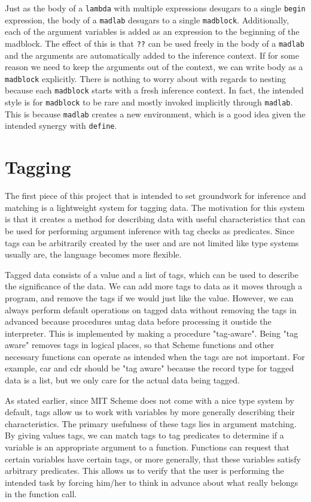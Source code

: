 \documentclass[11pt]{article}
\begin{document}
Just as the body of a \texttt{lambda} with multiple expressions
desugars to a single \texttt{begin} expression,
the body of a \texttt{madlab} desugars to a single \texttt{madblock}.
Additionally, each of the argument variables is added as an expression
to the beginning of the madblock.
The effect of this is that \texttt{??}
can be used freely in the body of a \texttt{madlab}
and the arguments are automatically added to the inference context.
If for some reason we need to keep the arguments out of the context,
we can write body as a \texttt{madblock} explicitly.
There is nothing to worry about with regards to nesting
because each \texttt{madblock} starts with a fresh inference context.
In fact, the intended style is for \texttt{madblock} to be rare
and mostly invoked implicitly through \texttt{madlab}.
This is because \texttt{madlab} creates a new environment,
which is a good idea given the intended synergy with \texttt{define}.

\section{Tagging}

The first piece of this project that is intended to set groundwork
for inference and matching is a lightweight system for tagging data.
The motivation for this system is that it creates a method for
describing data with useful characteristics that can be used for
performing argument inference with tag checks as predicates.
Since tags can be arbitrarily created by the user
and are not limited like type systems usually are,
the language becomes more flexible.

Tagged data consists of a value and a list of tags,
which can be used to describe the significance of the data.
We can add more tags to data as it moves through a program,
and remove the tags if we would just like the value.
However, we can always perform default operations on tagged data
without removing the tags in advanced because procedures
untag data before processing it oustide the interpreter. 
This is implemented by making a procedure "tag-aware".
Being "tag aware" removes tags in logical places, 
so that Scheme functions and other necessary functions
can operate as intended when the tags are not important.
For example, car and cdr should be "tag aware" because
the record type for tagged data is a list,
but we only care for the actual data being tagged.

As stated earlier, since MIT Scheme does not come 
with a nice type system by default,
tags allow us to work with variables
by more generally describing their characteristics.
The primary usefulness of these tags lies in argument matching.
By giving values tags, we can match tags to tag predicates
to determine if a variable is an appropriate argument to a function.
Functions can request that certain variables have certain tags,
or more generally, that these variables satisfy arbitrary predicates.
This allows us to verify that the user is performing the intended task
by forcing him/her to think in advance about what really belongs
in the function call.
\end{document}
